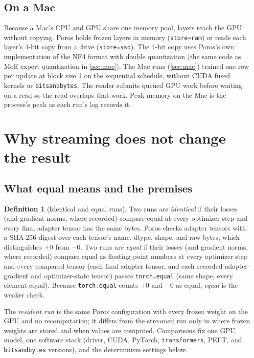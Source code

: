 \documentclass[11pt,letterpaper]{article}
\theoremstyle{definition}
\newtheorem{definition}{Definition}
\theoremstyle{plain}
\newcommand{\code}[1]{\texttt{\small #1}}
\begin{document}
\subsection{On a Mac}\label{sec:macdesign}
Because a Mac's CPU and GPU share one memory pool, layers reach the GPU without copying.
Poros holds frozen layers in memory (\code{store=ram}) or reads each layer's 4-bit copy from a drive (\code{store=ssd}).
The 4-bit copy uses Poros's own implementation of the NF4 format with double quantization (the same code as MoE expert quantization in \cref{sec:moe}).
The Mac runs (\cref{sec:mac}) trained one row per update at block size 1 on the sequential schedule, without CUDA fused kernels or \code{bitsandbytes}.
The reader submits queued GPU work before waiting on a read so the read overlaps that work.
Peak memory on the Mac is the process's peak as each run's log records it.
\section{Why streaming does not change the result}\label{sec:exact}

\subsection{What equal means and the premises}

\begin{definition}[Identical and equal runs]
Two runs are \emph{identical} if their losses (and gradient norms, where
recorded) compare equal at every optimizer step and every final adapter
tensor has the same bytes.
Poros checks adapter tensors with a SHA-256 digest over each tensor's
name, dtype, shape, and raw bytes, which distinguishes $+0$ from $-0$.
Two runs are \emph{equal} if their losses (and gradient norms, where
recorded) compare equal as floating-point numbers at every optimizer step
and every compared tensor (each final adapter tensor, and each recorded
adapter-gradient and optimizer-state tensor) passes \code{torch.equal}
(same shape, every element equal).
Because \code{torch.equal} counts $+0$ and $-0$ as equal, \emph{equal}
is the weaker check.
\end{definition}

The \emph{resident run} is the same Poros configuration with every frozen
weight on the GPU and no recomputation; it differs from the streamed run
only in where frozen weights are stored and when values are computed.
Comparisons fix one GPU model, one software stack (driver, CUDA, PyTorch,
\code{transformers}, PEFT, and \code{bitsandbytes} versions), and the
determinism settings below.
\end{document}
